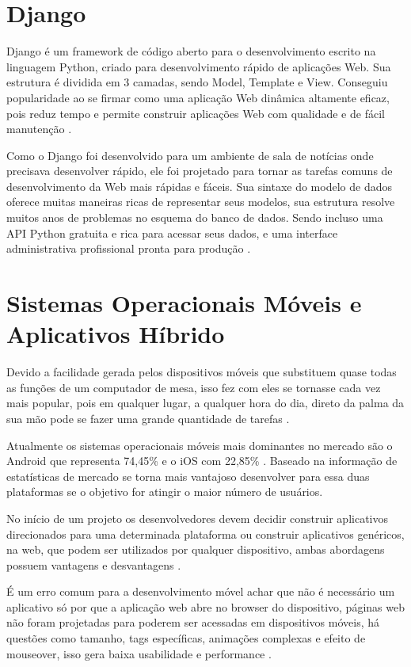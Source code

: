 \documentclass{ifto-tex}
\begin{document}
	
	\section{Django}
Django é um framework de código aberto para o desenvolvimento escrito na linguagem Python, criado para desenvolvimento rápido de aplicações Web.  Sua estrutura é dividida em 3 camadas, sendo Model, Template e View. Conseguiu popularidade ao se firmar como uma aplicação Web dinâmica altamente eficaz, pois reduz tempo e permite construir aplicações Web com qualidade e de fácil manutenção \cite{badindesenvolvimento}.

Como o Django foi desenvolvido para um ambiente de sala de notícias onde precisava desenvolver rápido, ele foi projetado para tornar as tarefas comuns de desenvolvimento da Web mais rápidas e fáceis. Sua sintaxe do modelo de dados oferece muitas maneiras ricas de representar seus modelos, sua estrutura resolve muitos anos de problemas no esquema do banco de dados. Sendo incluso uma API Python gratuita e rica para acessar seus dados, e uma interface administrativa profissional pronta para produção \cite{Djangoem92:online}.

	
	\section{Sistemas Operacionais Móveis e Aplicativos Híbrido}
	Devido a facilidade gerada pelos dispositivos móveis que substituem quase todas as funções de um computador de mesa, isso fez com eles se tornasse cada vez mais popular, pois em qualquer lugar, a qualquer hora do dia, direto da palma da sua mão pode se fazer uma grande quantidade de tarefas \cite{Sistemas41:online}.
	
	Atualmente os sistemas operacionais móveis mais dominantes no mercado são o Android que representa 74,45\% e o iOS com 22,85\% \cite{iOSvsAnd26:online}. Baseado na informação de estatísticas de mercado se torna mais vantajoso desenvolver para essa duas plataformas se o objetivo for atingir o maior número de usuários.
	
	No início de um projeto os desenvolvedores devem decidir construir aplicativos direcionados para uma determinada plataforma ou construir aplicativos genéricos, na web, que podem ser utilizados por qualquer dispositivo, ambas abordagens possuem vantagens e desvantagens \cite{Aplicaco50:online}.
	
	É um erro comum para a desenvolvimento móvel achar que não é necessário um aplicativo só por que a aplicação web abre no browser do dispositivo, páginas web não foram projetadas para poderem ser acessadas em dispositivos móveis, há questões como tamanho, tags específicas, animações complexas e efeito de mouseover, isso gera baixa usabilidade e performance \cite{Introduc9:online}.
	
\end{document}
